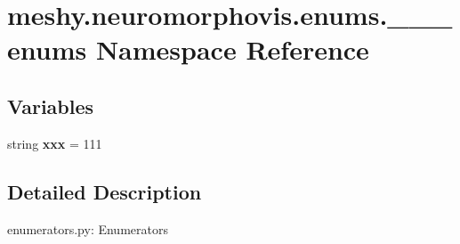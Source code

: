 \hypertarget{namespacemeshy_1_1neuromorphovis_1_1enums_1_1______enums}{}\section{meshy.\+neuromorphovis.\+enums.\+\_\+\+\_\+\+\_\+enums Namespace Reference}
\label{namespacemeshy_1_1neuromorphovis_1_1enums_1_1______enums}
\subsection*{Variables}
\begin{DoxyCompactItemize}
\item 
string {\bfseries xxx} = \textquotesingle{}111\textquotesingle{}\hypertarget{namespacemeshy_1_1neuromorphovis_1_1enums_1_1______enums_a07e8bc7701bd6299823244775bd2d486}{}\label{namespacemeshy_1_1neuromorphovis_1_1enums_1_1______enums_a07e8bc7701bd6299823244775bd2d486}

\end{DoxyCompactItemize}


\subsection{Detailed Description}
\begin{DoxyVerb}enumerators.py:
Enumerators
\end{DoxyVerb}
 
